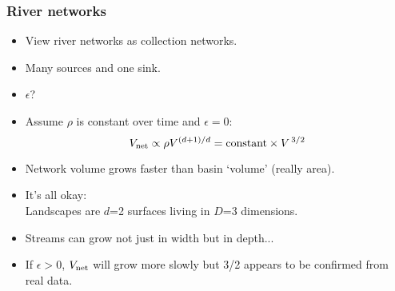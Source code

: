 

\begin{frame}
  \frametitle{River networks}

  \begin{itemize}
  \item<1-> View river networks as collection networks.
  \item<1-> Many sources and one sink.
  \item<2-> $\epsilon$?
  \item<3-> Assume $\rho$ is constant over time and $\epsilon=0$:
    $$V_{\textnormal{net}} \propto \rho V^{(d+1)/d} = \mbox{constant} \times V^{\, 3/2} $$
  \item<4-> Network volume grows faster than
    basin `volume' (really area).
  \item<5-> \alert{It's all okay:}\\ 
    Landscapes are $d$=2 surfaces living in $D$=3 dimensions.
  \item<6->
    Streams can grow not just in width but in depth...
  \item<7->
    If $\epsilon > 0$, $V_{\textnormal{net}}$ will grow more slowly
    but 3/2 appears to be confirmed from real data.
  \end{itemize}

\end{frame}

